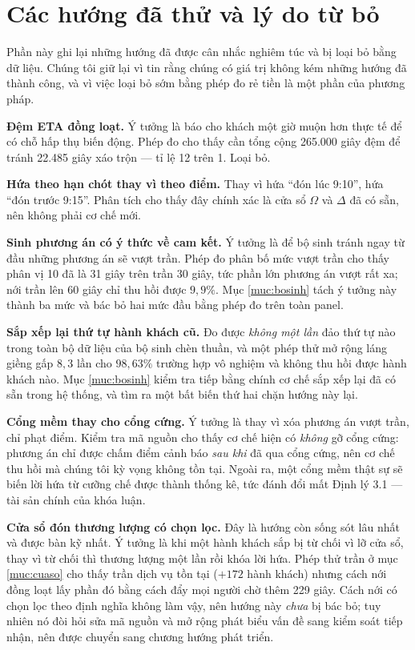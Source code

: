 \section{Các hướng đã thử và lý do từ bỏ}
\label{muc:dathu}

Phần này ghi lại những hướng đã được cân nhắc nghiêm túc và bị loại bỏ bằng dữ liệu. Chúng tôi
giữ lại vì tin rằng chúng có giá trị không kém những hướng đã thành công, và vì việc loại bỏ
sớm bằng phép đo rẻ tiền là một phần của phương pháp.

\textbf{Đệm ETA đồng loạt.} Ý tưởng là báo cho khách một giờ muộn hơn thực tế để có chỗ hấp thụ
biến động. Phép đo cho thấy cần tổng cộng 265.000 giây đệm để tránh 22.485 giây xáo trộn --- tỉ
lệ 12 trên 1. Loại bỏ.

\textbf{Hứa theo hạn chót thay vì theo điểm.} Thay vì hứa ``đón lúc 9:10'', hứa ``đón trước
9:15''. Phân tích cho thấy đây chính xác là cửa sổ $\Omega$ và $\Delta$ đã có sẵn, nên không
phải cơ chế mới.

\textbf{Sinh phương án có ý thức về cam kết.} Ý tưởng là để bộ sinh tránh ngay từ đầu những
phương án sẽ vượt trần. Phép đo phân bố mức vượt trần cho thấy phân vị 10 đã là 31 giây trên
trần 30 giây, tức phần lớn phương án vượt rất xa; nới trần lên 60 giây chỉ thu hồi được
$9{,}9\%$. Mục \ref{muc:bosinh} tách ý tưởng này thành ba mức và bác bỏ hai mức đầu bằng phép
đo trên toàn panel.

\textbf{Sắp xếp lại thứ tự hành khách cũ.} Đo được \emph{không một lần} đảo thứ tự nào trong
toàn bộ dữ liệu của bộ sinh chèn thuần, và một phép thử mở rộng láng giềng gấp $8{,}3$ lần cho
$98{,}63\%$ trường hợp vô nghiệm và không thu hồi được hành khách nào. Mục \ref{muc:bosinh}
kiểm tra tiếp bằng chính cơ chế sắp xếp lại đã có sẵn trong hệ thống, và tìm ra một bất biến
thứ hai chặn hướng này lại.

\textbf{Cổng mềm thay cho cổng cứng.} Ý tưởng là thay vì xóa phương án vượt trần, chỉ phạt điểm.
Kiểm tra mã nguồn cho thấy cơ chế hiện có \emph{không} gỡ cổng cứng: phương án chỉ được chấm
điểm cảnh báo \emph{sau khi} đã qua cổng cứng, nên cơ chế thu hồi mà chúng tôi kỳ vọng không tồn
tại. Ngoài ra, một cổng mềm thật sự sẽ biến lời hứa từ cưỡng chế được thành thống kê, tức đánh
đổi mất Định lý 3.1 --- tài sản chính của khóa luận.

\textbf{Cửa sổ đón thương lượng có chọn lọc.} Đây là hướng còn sống sót lâu nhất và được bàn kỹ
nhất. Ý tưởng là khi một hành khách sắp bị từ chối vì lỡ cửa sổ, thay vì từ chối thì thương
lượng một lần rồi khóa lời hứa. Phép thử trần ở mục \ref{muc:cuaso} cho thấy trần dịch vụ tồn tại
($+172$ hành khách) nhưng cách nới đồng loạt lấy phần đó bằng cách đẩy mọi người chờ thêm 229
giây. Cách nới có chọn lọc theo định nghĩa không làm vậy, nên hướng này \emph{chưa} bị bác bỏ;
tuy nhiên nó đòi hỏi sửa mã nguồn và mở rộng phát biểu vấn đề sang kiểm soát tiếp nhận, nên
được chuyển sang chương hướng phát triển.

